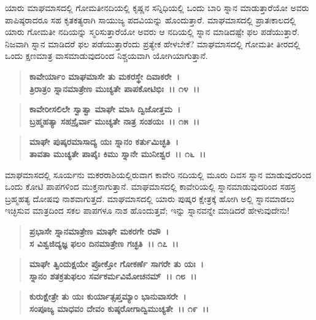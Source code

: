 ಯಾರು ಮಾಘಮಾಸದಲ್ಲಿ ಗೋಮತೀನದಿಯಲ್ಲಿ ಕೃಷ್ಣನ ಸನ್ನಿಧಿಯಲ್ಲಿ ಒಂದು ಬಾರಿ ಸ್ನಾನ ಮಾಡುತ್ತಾರೆಯೋ ಅವರು ಪಾಪಿಷ್ಠರಾದರೂ ಸಹ ಕೃತಕತ್ಯರಾಗಿ ಸಾಯುಜ್ಯ ಪದವಿಯನ್ನು ಹೊಂದುತ್ತಾರೆ. ಮಾಘಮಾಸದಲ್ಲಿ ಪ್ರಾತಃಕಾಲದಲ್ಲಿ ಯಾರು ಗೋಮತೀ ನದಿಯನ್ನು ಸ್ಮರಿಸುತ್ತಾರೆಯೋ ಅವರು ಆ ನದಿಯಲ್ಲಿ ಸ್ನಾನ ಮಾಡಿದಷ್ಟೇ ಫಲ ಪಡೆಯುತ್ತಾರೆ. ನಿಜವಾಗಿ ಸ್ನಾನ ಮಾಡಿದರೆ ಫಲ ಪಡೆಯುತ್ತಾರೆಂದು ಪ್ರತ್ಯೇಕ ಹೇಳಬೇಕೆ? ಮಾಘಮಾಸದಲ್ಲಿ ಗೋಮತೀ ತೀರದಲ್ಲಿ ಒಂದು ಕ್ಷಣಮಾತ್ರ ವಾಸಮಾಡುವುದರಿಂದ ನಿಶ್ಚಯವಾಗಿ ಯೋಗಿಯಾಗುತ್ತಾನೆ.

\begin{verse}
\textbf{ಕಾವೇರ್ಯಾಂ ಮಾಘಮಾಸೇ ತು ಮಕರಸ್ಥೇ ದಿವಾಕರೇ~।}\\\textbf{ತ್ರಿರಾತ್ರಂ ಸ್ನಾನಮಾತ್ರೇಣ ಮುಚ್ಯತೇ ಪಾಪಕೋಟಿಭಿಃ~।। ೧೪~।। }
\end{verse}

\begin{verse}
\textbf{ಕಾವೇರೀಸಲಿಲೇ ಸ್ವಾತ್ವಾ ಮಾಘೇ ಮಾಸಿ ದ್ವಿಜೋತ್ತಮ~।}\\\textbf{ಬ್ರಹ್ಮಹತ್ಯಾ ಸಹಸ್ರೈರ್ವಾ ಮುಚ್ಯತೇ ನಾತ್ರ ಸಂಶಯಃ~।। ೧೫~।।} 
\end{verse}

\begin{verse}
\textbf{ಮಾಘೇ ಪುಷ್ಕರಮಾಸಾದ್ಯ ಯಃ ಸ್ನಾನಂ ಕರ್ತುಮಿಚ್ಛತಿ~।}\\\textbf{ತಾವತಾ ಮುಚ್ಯತೇ ಪಾಪೈಃ ಕಿಮು ಸ್ನಾನೇ ಮುನೀಶ್ವರ~।। ೧೬~।।}
\end{verse}

ಮಾಘಮಾಸದಲ್ಲಿ ಸೂರ್ಯನು ಮಕರರಾಶಿಯಲ್ಲಿರುವಾಗ ಕಾವೇರಿ ನದಿಯಲ್ಲಿ ಮೂರು ದಿವಸ ಸ್ನಾನ ಮಾಡುವುದರಿಂದ ಒಂದು ಕೋಟಿ ಪಾಪಗಳಿಂದ ಮುಕ್ತನಾಗುತ್ತಾನೆ. ಮಾಘಮಾಸದಲ್ಲಿ ಕಾವೇರಿಯಲ್ಲಿ ಸ್ನಾನಮಾಡುವುದರಿಂದ ಸಹಸ್ರ ಬ್ರಹ್ಮಹತ್ಯ ದೋಷವು ನಾಶವಾಗುತ್ತದೆ. ಮಾಘಮಾಸದಲ್ಲಿ ಯಾರು ಪುಷ್ಕರ ಕ್ಷೇತ್ರಕ್ಕೆ ಹೋಗಿ ಅಲ್ಲಿ ಸ್ನಾನಮಾಡಲು ಇಚ್ಛಿಸುವ ಮಾತ್ರದಿಂದ ಸಕಲ ಪಾಪಗಳೂ ನಾಶ ಹೊಂದುತ್ತವೆ; ಇನ್ನು ಸ್ನಾನವನ್ನೇ ಮಾಡಿದರೆ ಹೇಳುವುದೇನು!

\begin{verse}
\textbf{ಪ್ರಭಾಸೇ ಸ್ನಾನಮಾತ್ರೇಣ ಮಾಘೇ ಮಕರಗೇ ರವೌ~।}\\\textbf{ಸ ವಿಶ್ವಜಿದ್ಯಜ್ಞ ಫಲಂ ದಿನಮಾತ್ರೇಣ ಗಚ್ಛತಿ~।। ೧೭~।। }
\end{verse}

\begin{verse}
\textbf{ಮಾಘೇ ತ್ವಿಂದುಕ್ಷಯೇ ಪ್ರೋಕ್ತೋ ಗೋಕರ್ಣೆ ಸಾಗರೇ ತು ಯಃ~।}\\\textbf{ಸ್ನಾನಂ ಶತಕ್ರತುಫಲಂ ಸರ್ವಕರ್ಮವಿಮೋಚನಮ್~।। ೧೮~।। }
\end{verse}

\begin{verse}
\textbf{ಕುರುಕ್ಷೇತ್ರೇ ತು ಯಃ ಕುರ್ಯಾತ್ಸಪ್ತಮ್ಯಾಂ ಭಾನುವಾಸರೇ~।}\\\textbf{ಸಂಪೂಜ್ಯ ಮಾಧವಂ ದೇವಂ ಕುಷ್ಠರೋಗಾದ್ವಿಮುಚ್ಯತೇ~।। ೧೯~।।} 
\end{verse}

